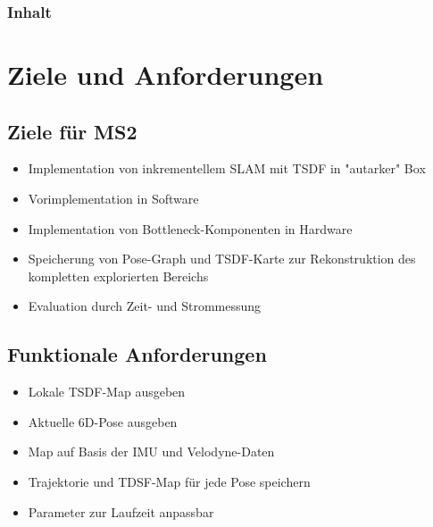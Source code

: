 \documentclass{beamer}
\begin{document}
{
\begin{frame}
\titlepage
\end{frame}}

\begin{frame}
\frametitle{Inhalt}
\tableofcontents
\end{frame}



\section{Ziele und Anforderungen}
\begin{frame}{}
\begin{center}
\end{center}
\end{frame}

\subsection{Ziele für MS2}
\begin{frame}{\subsecname}
\begin{itemize}
    \item Implementation von inkrementellem SLAM mit TSDF in "autarker" Box
    \item Vorimplementation in Software
    \item Implementation von Bottleneck-Komponenten in Hardware
    \item Speicherung von Pose-Graph und TSDF-Karte zur Rekonstruktion des kompletten explorierten Bereichs
    \item Evaluation durch Zeit- und Strommessung
\end{itemize}
\end{frame}

\subsection{Funktionale Anforderungen}
\begin{frame}{\subsecname}
\begin{itemize}
\item{Lokale TSDF-Map ausgeben}
\item{Aktuelle 6D-Pose ausgeben}
\item{Map auf Basis der IMU und Velodyne-Daten}
\item{Trajektorie und TDSF-Map für jede Pose speichern}
\item{Parameter zur Laufzeit anpassbar}
\end{itemize}
\end{frame}
\end{document}
